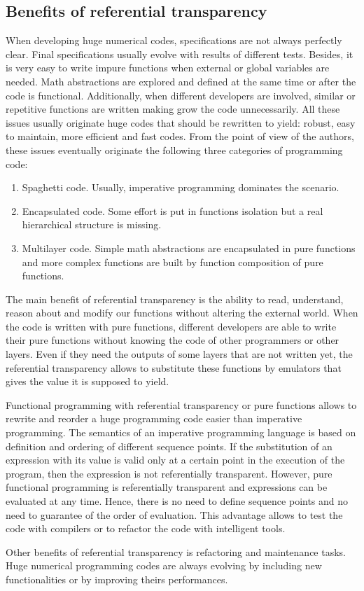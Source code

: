 \subsection{Benefits of referential transparency} 
When developing huge numerical codes, specifications are not always perfectly clear. 
Final specifications usually evolve with results of different tests. Besides, it is very easy to 
write impure functions when external or global variables are needed.
Math abstractions are explored and defined at the same time or after the code is functional. 
Additionally,  when different developers are involved,  
similar or repetitive functions are written making grow the code unnecessarily. 
All these issues usually originate  huge codes that should be 
rewritten to yield: robust, easy to maintain, more efficient and fast codes. 
From the point of view of the authors, these issues eventually originate 
the following three categories of programming code: 
\begin{enumerate}
\item Spaghetti code. Usually, imperative programming dominates the scenario. 
\item Encapsulated code. Some effort is put in functions isolation but a real hierarchical 
 structure is missing. 
\item Multilayer code. Simple math abstractions are encapsulated in pure functions and 
more complex functions are built by function composition of pure functions. 
\end{enumerate}
The main benefit of referential transparency  is
the ability to read, understand, reason about and modify our 
functions without altering the external world. 
When the code is written with pure functions, different developers are able to write 
their pure functions without knowing the code of other programmers or other layers. 
Even if they need the outputs of some layers that are not written yet, the referential
transparency allows to substitute these functions by emulators that gives
the value it is supposed to yield. 


Functional programming  with referential transparency or pure functions allows to rewrite and reorder 
a huge programming code easier than imperative programming. 
The semantics of an imperative programming language is based on definition 
and ordering of different sequence points.
If the substitution of an expression with its value is valid only at a certain point 
in the execution of the program, then the expression is 
not referentially transparent. 
However, pure functional programming 
is referentially transparent and expressions can be evaluated at any time. 
Hence, there is no need to define sequence points and no need 
to guarantee of the order of evaluation. 
This advantage allows to test the code with compilers or to refactor
the code with intelligent tools. 

Other benefits of referential transparency is refactoring and maintenance tasks. 
Huge numerical programming codes are always evolving by including new functionalities 
or by improving theirs performances. 

  
  